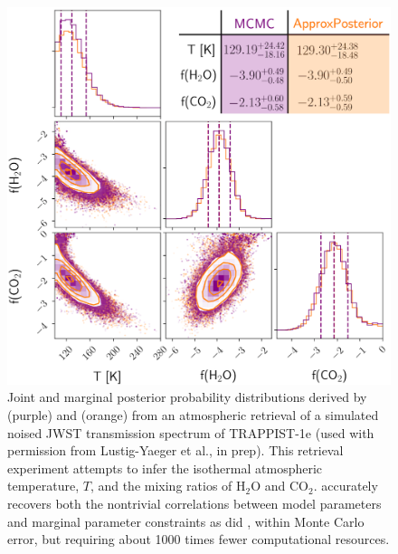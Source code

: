 \begin{figure}
\centering
	\includegraphics[width=\textwidth]{emceeAPComparison.png}
   \caption{Joint and marginal posterior probability distributions derived by \emcee (purple) and \approxposterior (orange) from an atmospheric retrieval of a simulated noised JWST transmission spectrum of TRAPPIST-1e (used with permission from Lustig-Yaeger et al., in prep). This retrieval experiment attempts to infer the isothermal atmospheric temperature, $T$, and the mixing ratios of H$_2$O and CO$_2$. \approxposterior accurately recovers both the nontrivial correlations between model parameters and marginal parameter constraints as did \emcee, within Monte Carlo error, but requiring about 1000 times fewer computational resources.}%
    \label{AP:fig:comparison}%
\end{figure}


